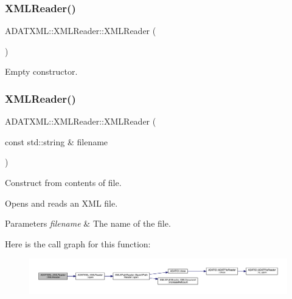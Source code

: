 \subsubsection{\texorpdfstring{XMLReader()}{XMLReader()}\hspace{0.1cm}{\footnotesize\ttfamily [6/15]}}
{\footnotesize\ttfamily A\+D\+A\+T\+X\+M\+L\+::\+X\+M\+L\+Reader\+::\+X\+M\+L\+Reader (\begin{DoxyParamCaption}{ }\end{DoxyParamCaption})\hspace{0.3cm}{\ttfamily [inline]}}



Empty constructor. 

\mbox{\label{classADATXML_1_1XMLReader_a85d8af8a27febdd66251e20bd96ccc32}} 
\subsubsection{\texorpdfstring{XMLReader()}{XMLReader()}\hspace{0.1cm}{\footnotesize\ttfamily [7/15]}}
{\footnotesize\ttfamily A\+D\+A\+T\+X\+M\+L\+::\+X\+M\+L\+Reader\+::\+X\+M\+L\+Reader (\begin{DoxyParamCaption}\item[{const std\+::string \&}]{filename }\end{DoxyParamCaption})\hspace{0.3cm}{\ttfamily [inline]}}



Construct from contents of file. 

Opens and reads an X\+ML file. 
\begin{DoxyParams}{Parameters}
{\em filename} & The name of the file. \\
\hline
\end{DoxyParams}
Here is the call graph for this function\+:
\nopagebreak
\begin{figure}[H]
\begin{center}
\leavevmode
\includegraphics[width=350pt]{db/d3f/classADATXML_1_1XMLReader_a85d8af8a27febdd66251e20bd96ccc32_cgraph}
\end{center}
\end{figure}
\mbox{\label{classADATXML_1_1XMLReader_a8025cb1c53d6ceb8a694bdbd8e1f383b}} 
